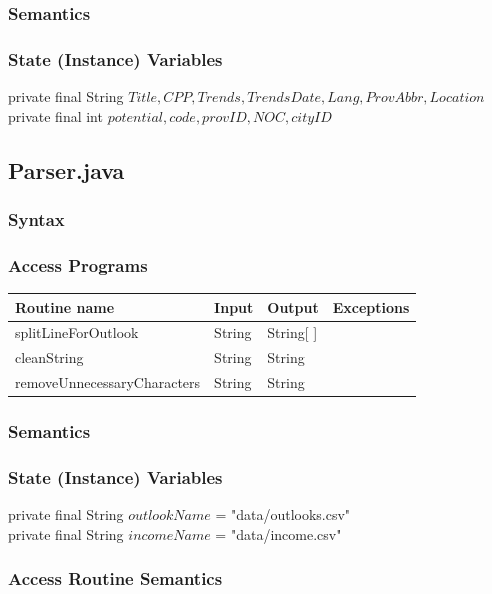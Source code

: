 \documentclass[12pt,fleqn]{article}
\begin{document}
\subsubsection*{Semantics}
\subsubsection*{State (Instance) Variables}
	private final String $Title,CPP,Trends,TrendsDate,Lang,ProvAbbr,Location$\\
	private final int $potential,code,provID, NOC, cityID$\\


\subsection*{Parser.java}\label{pparser}
\subsubsection* {Syntax}

\subsubsection* {Access Programs}
\begin{tabular}{| l | l | l | l |}
\hline
\textbf{Routine name} & \textbf{Input} & \textbf{Output} & \textbf{Exceptions}\\
\hline
splitLineForOutlook & String & String[ ] & ~\\
\hline
cleanString & String & String & ~\\
\hline
removeUnnecessaryCharacters & String & String & ~\\
\hline
\end{tabular}

\subsubsection*{Semantics}
\subsubsection*{State (Instance) Variables}
	private final String $outlookName$ = "data/outlooks.csv"\\
	private final String $incomeName$ = "data/income.csv"\\

\subsubsection*{Access Routine Semantics}
\end{document}
